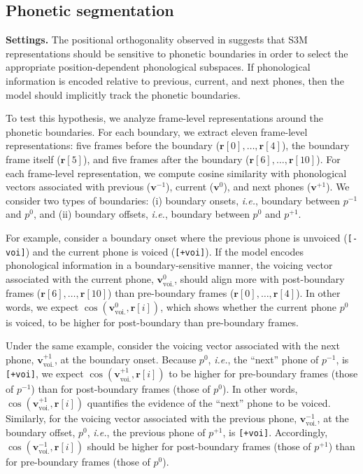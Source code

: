 \documentclass[cameraready]{Interspeech}
\begin{document}

\subsection{Phonetic segmentation}\label{ss:segmentation}

\textbf{Settings.}
The positional orthogonality observed in  suggests that S3M representations should be sensitive to phonetic boundaries in order to select the appropriate position-dependent phonological subspaces.
If phonological information is encoded relative to previous, current, and next phones, then the model should implicitly track the phonetic boundaries.


To test this hypothesis, we analyze frame-level representations around the phonetic boundaries.
For each boundary, we extract eleven frame-level representations: five frames before the boundary ($\mathbf{r}[0], \ldots, \mathbf{r}[4]$), the boundary frame itself ($\mathbf{r}[5]$), and five frames after the boundary ($\mathbf{r}[6], \ldots, \mathbf{r}[10]$).
For each frame-level representation, we compute cosine similarity with phonological vectors associated with previous ($\mathbf{v}^{-1}$), current ($\mathbf{v}^{0}$), and next phones ($\mathbf{v}^{+1}$).
We consider two types of boundaries: (i) boundary onsets, \textit{i.e.}, boundary between $p^{-1}$ and $p^0$, and (ii) boundary offsets, \textit{i.e.}, boundary between $p^{0}$ and $p^{+1}$.


For example, consider a boundary onset where the previous phone is unvoiced (\texttt{[-voi]}) and the current phone is voiced (\texttt{[+voi]}).
If the model encodes phonological information in a boundary-sensitive manner, the voicing vector associated with the current phone, $\mathbf{v}^{0}_{\text{voi.}}$, should align more with post-boundary frames ($\mathbf{r}[6], \ldots, \mathbf{r}[10]$) than pre-boundary frames ($\mathbf{r}[0], \ldots, \mathbf{r}[4]$).
In other words, we expect $\cos(\mathbf{v}^{0}_{\text{voi.}}, \mathbf{r}[i])$, which shows whether the current phone $p^0$ is voiced, to be higher for post-boundary than pre-boundary frames.



Under the same example, consider the voicing vector associated with the next phone, $\mathbf{v}^{+1}_{\text{voi.}}$, at the boundary onset.
Because $p^{0}$, \textit{i.e.}, the ``next'' phone of $p^{-1}$, is \texttt{[+voi]}, we expect $\cos(\mathbf{v}^{+1}_{\text{voi.}}, \mathbf{r}[i])$ to be higher for pre-boundary frames (those of $p^{-1}$) than for post-boundary frames (those of $p^0$).
In other words, $\cos(\mathbf{v}^{+1}_{\text{voi.}}, \mathbf{r}[i])$ quantifies the evidence of the ``next'' phone to be voiced.
Similarly, for the voicing vector associated with the previous phone, $\mathbf{v}^{-1}_{\text{voi.}}$, at the boundary offset, $p^{0}$, \textit{i.e.}, the previous phone of $p^{+1}$, is \texttt{[+voi]}.
Accordingly, $\cos(\mathbf{v}^{-1}_{\text{voi.}}, \mathbf{r}[i])$ should be higher for post-boundary frames (those of $p^{+1}$) than for pre-boundary frames (those of $p^0$).
\end{document}
